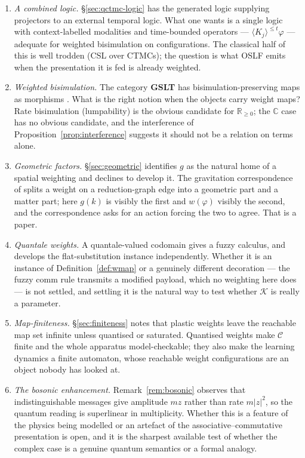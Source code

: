\documentclass[11pt,a4paper]{article}
\theoremstyle{plain}
\theoremstyle{definition}
\theoremstyle{remark}
\newcommand{\Rnn}{\mathbb{R}_{\geq 0}}
\newcommand{\Cx}{\mathbb{C}}
\newcommand{\Cfg}{\mathcal{C}}
\newcommand{\wmap}{w}
\newcommand{\gfac}{g}
\begin{document}
\begin{enumerate}[leftmargin=2.2em]
\item \emph{A combined logic.} \S\ref{sec:qctmc-logic} has the generated logic supplying projectors
to an external temporal logic. What one wants is a single logic with context-labelled modalities and
time-bounded operators --- $\langle K_j \rangle^{\leq t}\varphi$ --- adequate for weighted
bisimulation on configurations. The classical half of this is well trodden (CSL over CTMCs); the
question is what OSLF emits when the presentation it is fed is already weighted.
\item \emph{Weighted bisimulation.} The category \textbf{GSLT} has bisimulation-preserving maps as
morphisms \cite{omnibus}. What is the right notion when the objects carry weight maps? Rate
bisimulation (lumpability) is the obvious candidate for $\Rnn$; the $\Cx$ case has no obvious
candidate, and the interference of Proposition~\ref{prop:interference} suggests it should not be a
relation on terms alone.
\item \emph{Geometric factors.} \S\ref{sec:geometric} identifies $\gfac$ as the natural home of a
spatial weighting and declines to develop it. The gravitation correspondence of
\cite{costspacetime} splits a weight on a reduction-graph edge into a geometric part and a matter
part; here $\gfac(k)$ is visibly the first and $\wmap(\varphi)$ visibly the second, and the
correspondence asks for an action forcing the two to agree. That is a paper.
\item \emph{Quantale weights.} A quantale-valued codomain gives a fuzzy calculus, and \cite{fuzzy}
develops the flat-substitution instance independently. Whether it is an instance of
Definition~\ref{def:wmap} or a genuinely different decoration --- the fuzzy comm rule transmits a
modified payload, which no weighting here does --- is not settled, and settling it is the natural
way to test whether $\mathcal{K}$ is really a parameter.
\item \emph{Map-finiteness.} \S\ref{sec:finiteness} notes that plastic weights leave the reachable
map set infinite unless quantised or saturated. Quantised weights make $\Cfg$ finite and the whole
apparatus model-checkable; they also make the learning dynamics a finite automaton, whose reachable
weight configurations are an object nobody has looked at.
\item \emph{The bosonic enhancement.} Remark~\ref{rem:bosonic} observes that indistinguishable
messages give amplitude $m z$ rather than rate $m|z|^2$, so the quantum reading is superlinear in
multiplicity. Whether this is a feature of the physics being modelled or an artefact of the
associative--commutative presentation is open, and it is the sharpest available test of whether the
complex case is a genuine quantum semantics or a formal analogy.
\end{enumerate}
\end{document}
